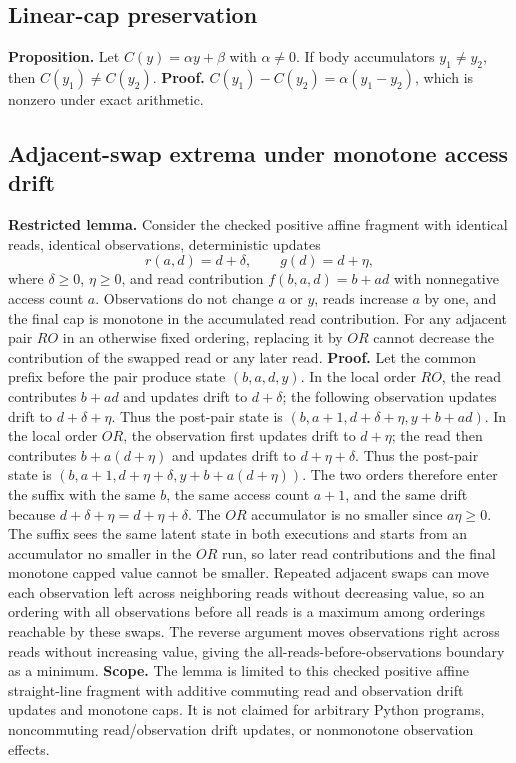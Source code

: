 \subsection{Linear-cap preservation}
\textbf{Proposition.} Let $C(y)=\alpha y+\beta$ with $\alpha\ne0$. If body accumulators $y_1\ne y_2$, then $C(y_1)\ne C(y_2)$. \textbf{Proof.} $C(y_1)-C(y_2)=\alpha(y_1-y_2)$, which is nonzero under exact arithmetic.

\subsection{Adjacent-swap extrema under monotone access drift}
\textbf{Restricted lemma.} Consider the checked positive affine fragment with identical reads, identical observations, deterministic updates
\[
r(a,d)=d+\delta,\qquad g(d)=d+\eta,
\]
where $\delta\ge0$, $\eta\ge0$, and read contribution $f(b,a,d)=b+a d$ with nonnegative access count $a$. Observations do not change $a$ or $y$, reads increase $a$ by one, and the final cap is monotone in the accumulated read contribution. For any adjacent pair $RO$ in an otherwise fixed ordering, replacing it by $OR$ cannot decrease the contribution of the swapped read or any later read. \textbf{Proof.} Let the common prefix before the pair produce state $(b,a,d,y)$. In the local order $RO$, the read contributes $b+a d$ and updates drift to $d+\delta$; the following observation updates drift to $d+\delta+\eta$. Thus the post-pair state is $(b,a+1,d+\delta+\eta,y+b+a d)$. In the local order $OR$, the observation first updates drift to $d+\eta$; the read then contributes $b+a(d+\eta)$ and updates drift to $d+\eta+\delta$. Thus the post-pair state is $(b,a+1,d+\eta+\delta,y+b+a(d+\eta))$. The two orders therefore enter the suffix with the same $b$, the same access count $a+1$, and the same drift because $d+\delta+\eta=d+\eta+\delta$. The $OR$ accumulator is no smaller since $a\eta\ge0$. The suffix sees the same latent state in both executions and starts from an accumulator no smaller in the $OR$ run, so later read contributions and the final monotone capped value cannot be smaller. Repeated adjacent swaps can move each observation left across neighboring reads without decreasing value, so an ordering with all observations before all reads is a maximum among orderings reachable by these swaps. The reverse argument moves observations right across reads without increasing value, giving the all-reads-before-observations boundary as a minimum. \textbf{Scope.} The lemma is limited to this checked positive affine straight-line fragment with additive commuting read and observation drift updates and monotone caps. It is not claimed for arbitrary Python programs, noncommuting read/observation drift updates, or nonmonotone observation effects.

